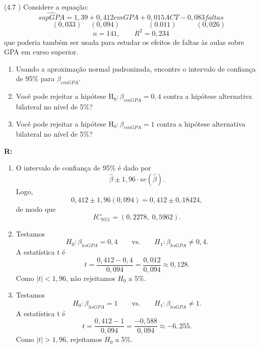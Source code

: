 \documentclass[12pt,letterpaper, onecolumn]{exam}
\renewenvironment{solution}
  {\par\noindent\textbf{R:}\enspace\color{blue}}
  {\par\color{black}}
\begin{document}
\begin{questions}

    \question\qstar (4.7 \cite{wooldridge2010}) Considere a equação: \[
    \widehat{supGPA} = 1,39 + 0,412emGPA + 0,015ACT -0,083 faltas
    \]\vspace{-2.0em}\[
    \phantom{\widehat{su-}} (0,033)  \phantom{ + } (0,094) \phantom{----} (0.011)\phantom{ ---} (0,026)
    \]\vspace{-1.0em}\[
    n = 141,\quad \quad  R^2 =0,234
    \] que poderia também ser usada para estudar os efeitos de faltas às aulas sobre GPA em curso superior.
    \begin{enumerate}[label=(\alph*)]
    \item Usando a aproximação normal padronizada, encontre o intervalo de confiança de 95\% para $\beta_{emGPA}$.
    \item Você pode rejeitar a hipótese $\text{H}_0: \beta_{emGPA} = 0,4$ contra a hipótese alternativa bilateral no nível de 5\%?
    \item Você pode rejeitar a hipótese $\text{H}_0: \beta_{emGPA} = 1$ contra a hipótese alternativa bilateral no nível de 5\%?
    \end{enumerate}
\begin{solution}
\begin{enumerate}[label=(\alph*)]
    \item O intervalo de confiança de 95\% é dado por
    \[
    \hat\beta \pm 1,96\cdot se(\hat\beta).
    \]
    Logo,
    \[
    0,412 \pm 1,96(0,094)=0,412 \pm 0,18424,
    \]
    de modo que
    \[
    IC_{95\%}=(0,2278,\;0,5962).
    \]

    \item Testamos
    \[
    H_0:\beta_{hsGPA}=0,4
    \qquad \text{vs.} \qquad
    H_1:\beta_{hsGPA}\neq 0,4.
    \]
    A estatística t é
    \[
    t=\frac{0,412-0,4}{0,094}=\frac{0,012}{0,094}\approx 0,128.
    \]
    Como \(|t|<1,96\), não rejeitamos \(H_0\) a 5\%.

    \item Testamos
    \[
    H_0:\beta_{hsGPA}=1
    \qquad \text{vs.} \qquad
    H_1:\beta_{hsGPA}\neq 1.
    \]
    A estatística t é
    \[
    t=\frac{0,412-1}{0,094}=\frac{-0,588}{0,094}\approx -6,255.
    \]
    Como \(|t|>1,96\), rejeitamos \(H_0\) a 5\%.
\end{enumerate}
\end{solution}

\
\



\end{questions}
\end{document}
